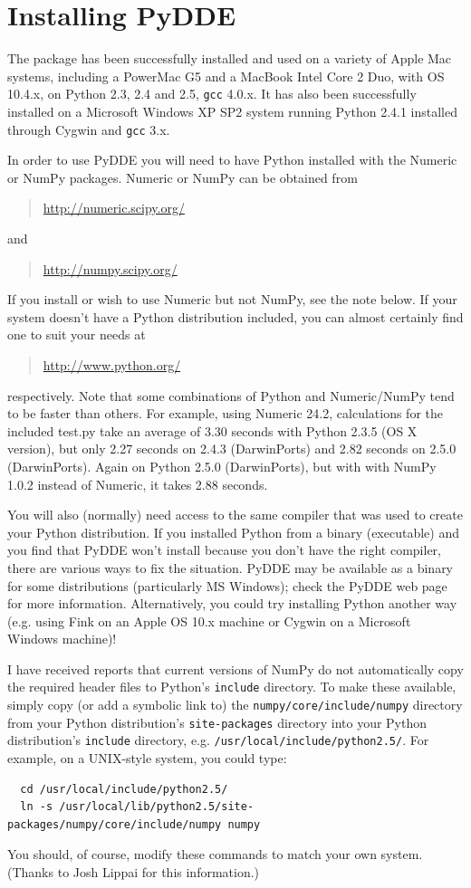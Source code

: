 \documentclass[10pt,a4paper] {article}
\begin{document}
\section{Installing PyDDE}

The package has been successfully installed and used on a variety of Apple Mac systems, including a PowerMac G5 and a MacBook Intel Core 2 Duo,  with OS 10.4.x, on Python 2.3, 2.4 and 2.5, \verb+gcc+ 4.0.x.  It has also been successfully installed on a Microsoft Windows XP SP2 system running Python 2.4.1 installed through Cygwin and \verb+gcc+ 3.x.

In order to use PyDDE you will need to have Python installed with the Numeric or NumPy packages.  Numeric or NumPy can be obtained from 
\begin{quotation}\url{http://numeric.scipy.org/}\end{quotation}
and
\begin{quotation}\url{http://numpy.scipy.org/}\end{quotation}
If you install or wish to use Numeric but not NumPy, see the note below.  If your system doesn't have a Python distribution included, you can almost certainly find one to suit your needs at
\begin{quotation}\url{http://www.python.org/}\end{quotation}
respectively.  Note that some combinations of Python and Numeric/NumPy tend to be faster than others.  For example, using Numeric 24.2, calculations for the included test.py take an average of 3.30 seconds with Python 2.3.5 (OS X version), but only 2.27 seconds on 2.4.3 (DarwinPorts) and 2.82 seconds on 2.5.0 (DarwinPorts).  Again on Python 2.5.0 (DarwinPorts), but with with NumPy 1.0.2 instead of Numeric, it takes 2.88 seconds.

You will also (normally) need access to the same compiler that was used to create your Python distribution.  If you installed Python from a binary (executable) and you find that PyDDE won't install because you don't have the right compiler, there are various ways to fix the situation.  PyDDE may be available as a binary for some distributions (particularly MS Windows); check the PyDDE web page for more information. Alternatively, you could try installing Python another way (e.g. using Fink on an Apple OS 10.x machine or Cygwin on a Microsoft Windows machine)!

I have received reports that current versions of NumPy do not automatically copy the required header files to Python's \verb+include+ directory.  To make these available, simply copy (or add a symbolic link to) the \verb+numpy/core/include/numpy+ directory from your Python distribution's \verb+site-packages+ directory into your Python distribution's \verb+include+ directory, e.g. \verb+/usr/local/include/python2.5/+.  For example, on a UNIX-style system, you could type:
\begin{verbatim}
  cd /usr/local/include/python2.5/
  ln -s /usr/local/lib/python2.5/site-packages/numpy/core/include/numpy numpy
\end{verbatim}
You should, of course, modify these commands to match your own system.  (Thanks to Josh Lippai for this information.)
\end{document}
